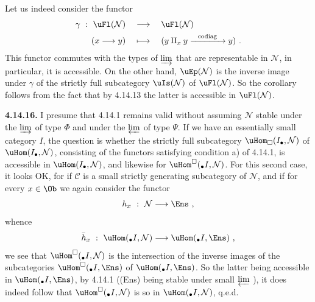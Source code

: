 
Let us indeed consider the functor
\[
\begin{aligned}
\gamma \ : \ \uFl(\mathcal{N}) \quad &\longrightarrow \quad \uFl(\mathcal{N}) \\
(x \longrightarrow y) \quad &\longmapsto \quad (y \amalg_x y \xrightarrow{\ \ \text{codiag}\ \ } y) \ .
\end{aligned}
\]
This functor commutes with the types of $\varinjlim$ that are representable in $\mathcal{N}$, in particular, it is accessible. On the other hand, $\uEp(\mathcal{N})$ is the inverse image under $\gamma$ of the strictly full subcategory $\uIs(\mathcal{N})$ of $\uFl(\mathcal{N})$. So the corollary follows from the fact that by 4.14.13 the latter is accessible in $\uFl(\mathcal{N})$.

\textbf{4.14.16.} I presume that 4.14.1 remains valid without assuming $\mathcal{N}$ stable under the $\varinjlim$ of type $\Phi$ and under the $\varprojlim$ of type $\Psi$. If we have an essentially small category $I$, the question is whether the strictly full subcategory $\uHom_{\square}(I_\bullet,\mathcal{N})$ of $\uHom(I_\bullet,\mathcal{N})$, consisting of the functors satisfying
condition a) of 4.14.1, is accessible in $\uHom(I_\bullet,\mathcal{N})$, and likewise for $\uHom^{\square}({}_\bullet I,\mathcal{N})$. For this second case, it looks OK, for if $\mathcal{C}$ is a small strictly generating subcategory of $\mathcal{N}$, and if for every $x \in \Ob$ we again consider the functor
\[
h_x \ : \ \mathcal{N} \longrightarrow \Ens \ ,
\]
whence
\[
\bar{h}_x \ : \ \uHom({}_\bullet I,\mathcal{N}) \longrightarrow \uHom({}_\bullet I,\Ens) \ ,
\]
we see that $\uHom^{\square}({}_\bullet I,\mathcal{N})$ is the intersection of the inverse images of the subcategories $\uHom^{\square}({}_\bullet I,\Ens)$ of $\uHom({}_\bullet I,\Ens)$. So the latter being accessible in $\uHom({}_\bullet I,\Ens)$, by 4.14.1 ((Ens) being stable under small $\varprojlim$ ), it does indeed follow that $\uHom^{\square}({}_\bullet I,\mathcal{N})$ is so in $\uHom({}_\bullet I,\mathcal{N})$, q.e.d.

